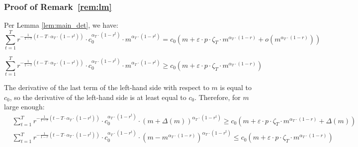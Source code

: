 \documentclass[blindrev]{informs3noheader}
\begin{document}






\subsubsection{Proof of Remark~\ref{rem:lm}}

Per Lemma \ref{lem:main_det}, we have:
\[\sum_{t=1}^T r^{-\frac{1}{1-r}\left(t-T\cdot\alpha_T\cdot(1-r^t)\right)}\cdot c_0^{\alpha_T\cdot(1-r^t)}\cdot m^{\alpha_T\cdot(1-r^t)}= c_0\left(m+\varepsilon\cdot p\cdot\zeta_T\cdot m^{\alpha_T\cdot(1-r)} + o\left(m^{\alpha_T \cdot (1-r)}\right)\right) \]

\[\sum_{t=1}^T r^{-\frac{1}{1-r}\left(t-T\cdot\alpha_T\cdot(1-r^t)\right)}\cdot c_0^{\alpha_T\cdot(1-r^t)}\cdot m^{\alpha_T\cdot(1-r^t)}\geq c_0\left(m+\varepsilon\cdot p\cdot\zeta_T\cdot m^{\alpha_T\cdot(1-r)}\right) \]

The derivative of the last term of the left-hand side with respect to $m$ is equal to $c_0$, so the derivative of the left-hand side is at least equal to $c_0$. Therefore, for $m$ large enough:
\begin{align*}
& \sum_{t=1}^T r^{-\frac{1}{1-r}\left(t-T\cdot\alpha_T\cdot(1-r^t)\right)}\cdot c_0^{\alpha_T\cdot(1-r^t)}\cdot (m+\Delta(m))^{\alpha_T\cdot(1-r^t)}\geq c_0\left(m+\varepsilon\cdot p\cdot\zeta_T\cdot m^{\alpha_T\cdot(1-r)} + \Delta(m)\right)\\
& \sum_{t=1}^T r^{-\frac{1}{1-r}\left(t-T\cdot\alpha_T\cdot(1-r^t)\right)}\cdot c_0^{\alpha_T\cdot(1-r^t)}\cdot \left(m-m^{\alpha_T\cdot(1-r)}\right)^{\alpha_T\cdot(1-r^t)}\leq c_0\left(m+\varepsilon\cdot p\cdot\zeta_T\cdot m^{\alpha_T\cdot(1-r)} \right)
\end{align*}
\end{document}
